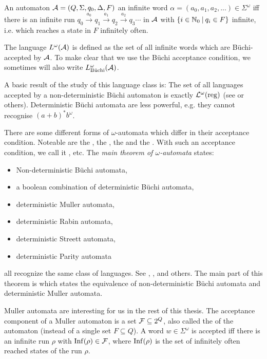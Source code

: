 An automaton $\mathcal{A} = (Q, \Sigma, q_0, \Delta, F)$  an infinite word $\alpha = (a_0,a_1,a_2,...) \in \Sigma^\omega$ iff there is an infinite run $q_0 \xrightarrow{a_0} q_1 \xrightarrow{a_1} q_2 \xrightarrow{a_2} q_3 \cdots$ in $\mathcal{A}$ with $\Set{ i \in \N_0 }{ q_i \in F }$ infinite, i.e. which reaches a state in $F$ infinitely often.

The language $L^\omega(\mathcal{A})$ is defined as the set of all infinite words which are Büchi-accepted by  $\mathcal{A}$. To make clear that we use the Büchi acceptance condition, we sometimes will also write $L^\omega_\text{Büchi}(\mathcal{A})$.

A basic result of the study of this language class is: The set of all languages accepted by a non-deterministic Büchi automaton is exactly $\mathcal{L}^\omega(\textup{\textrm{reg}})$ (see \cite{InfCompR101} or others). %
Deterministic Büchi automata are less powerful, e.g. they cannot recognise $(a+b)^* b^\omega$.

There are some different forms of $\omega$-automata which differ in their acceptance condition. Noteable are the , the , the  and the . With such an acceptance condition, we call it , etc. The \emph{main theorem of $\omega$-automata} states:
\begin{itemize}
\item Non-deterministic Büchi automata,
\item a boolean combination of deterministic Büchi automata,
\item deterministic Muller automata,
\item deterministic Rabin automata,
\item deterministic Streett automata,
\item deterministic Parity automata
\end{itemize}
all recognize the same class of languages. See \cite{InfCompR101}, \cite{LangAutLogicR102}, \cite{InfWordsR110} and others. The main part of this theorem is  which states the equivalence of non-deterministic Büchi automata and deterministic Muller automata.

Muller automata are interesting for us in the rest of this thesis. The acceptance component of a Muller automaton is a set $\mathcal{F} \subseteq 2^Q$, also called the  of the automaton (instead of a single set $F \subseteq Q$). A word $w \in \Sigma^\omega$ is accepted iff there is an infinite run $\rho$ with $\operatorname{Inf}(\rho) \in \mathcal{F}$, where $\operatorname{Inf}(\rho)$ is the set of infinitely often reached states of the run $\rho$.

